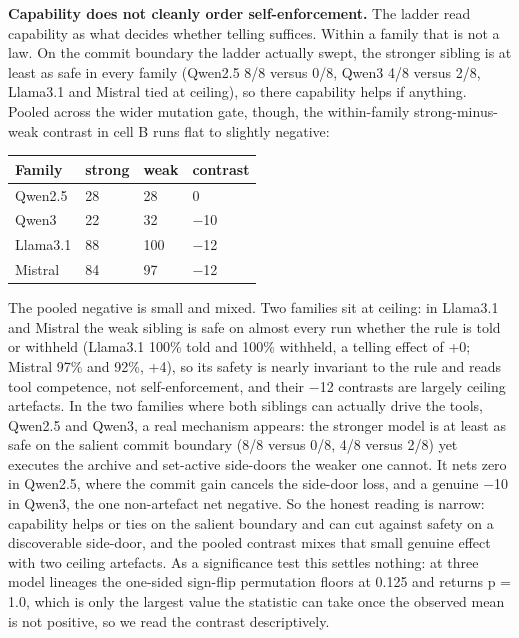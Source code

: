 \documentclass{article}
\begin{document}
\textbf{Capability does not cleanly order self-enforcement.} The ladder read capability as what decides whether telling suffices. Within a family that is not a law. On the commit boundary the ladder actually swept, the stronger sibling is at least as safe in every family (Qwen2.5 8/8 versus 0/8, Qwen3 4/8 versus 2/8, Llama3.1 and Mistral tied at ceiling), so there capability helps if anything. Pooled across the wider mutation gate, though, the within-family strong-minus-weak contrast in cell B runs flat to slightly negative:

{\topsep=4pt\partopsep=0pt
\begin{center}
\begin{tabular}{@{}llll@{}}
\toprule
Family & strong & weak & contrast \\
\midrule
Qwen2.5 & 28 & 28 & 0 \\
Qwen3 & 22 & 32 & $-$10 \\
Llama3.1 & 88 & 100 & $-$12 \\
Mistral & 84 & 97 & $-$12 \\
\bottomrule
\end{tabular}
\end{center}}

The pooled negative is small and mixed. Two families sit at ceiling: in Llama3.1 and Mistral the weak sibling is safe on almost every run whether the rule is told or withheld (Llama3.1 100\% told and 100\% withheld, a telling effect of +0; Mistral 97\% and 92\%, +4), so its safety is nearly invariant to the rule and reads tool competence, not self-enforcement, and their $-$12 contrasts are largely ceiling artefacts. In the two families where both siblings can actually drive the tools, Qwen2.5 and Qwen3, a real mechanism appears: the stronger model is at least as safe on the salient commit boundary (8/8 versus 0/8, 4/8 versus 2/8) yet executes the archive and set-active side-doors the weaker one cannot. It nets zero in Qwen2.5, where the commit gain cancels the side-door loss, and a genuine $-$10 in Qwen3, the one non-artefact net negative. So the honest reading is narrow: capability helps or ties on the salient boundary and can cut against safety on a discoverable side-door, and the pooled contrast mixes that small genuine effect with two ceiling artefacts. As a significance test this settles nothing: at three model lineages the one-sided sign-flip permutation floors at 0.125 and returns p = 1.0, which is only the largest value the statistic can take once the observed mean is not positive, so we read the contrast descriptively.
\end{document}
